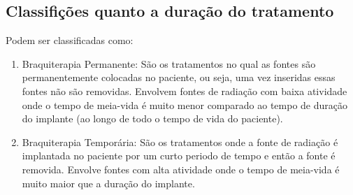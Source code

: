 \documentclass[12pt,a4paper]{article}
\begin{document}
	\subsection{Classifições quanto a duração do tratamento}

	Podem ser classificadas como:

	\begin{enumerate}
		\item Braquiterapia Permanente:  São os tratamentos no qual as fontes são permanentemente colocadas no paciente, ou seja, uma vez inseridas essas fontes não são removidas. Envolvem fontes de radiação com baixa atividade onde o tempo de meia-vida é muito menor comparado ao tempo de duração do implante (ao longo de todo o tempo de vida do paciente).
		
		\item Braquiterapia Temporária: São os tratamentos onde a fonte de radiação é implantada no paciente por um curto periodo de tempo e então a fonte é removida. Envolve fontes com alta atividade onde o tempo de meia-vida é muito maior que a duração do implante.
		
	\end{enumerate}


	
\end{document}
